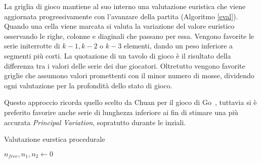 \documentclass{article}
\begin{document}
La griglia di gioco mantiene al suo interno una valutazione euristica che viene
aggiornata progressivamente con l'avanzare della partita (Algoritmo \vref{eval}). Quando una cella viene
marcata si valuta la variazione del valore euristico osservando le righe,
colonne e diaginali che passano per essa. Vengono favorite le serie initerrotte
di $k-1, k-2$ o $k-3$ elementi, dando un peso inferiore a segmenti pi\`u corti.
La quotazione di un tavolo di gioco \`e il risultato della differenza tra i
valori delle serie dei due giocatori. Oltretutto vengono favorite griglie che
assumono valori promettenti con il minor numero di mosse, dividendo ogni
valutazione per la profondit\`a dello stato di gioco.

Questo approccio ricorda quello scelto da Chuan per il gioco di Go~\cite{chuan},
tuttavia si \`e preferito favorire anche serie di lunghezza inferiore ai fin di
stimare una pi\`u accurata \emph{Principal Variation}, sopratutto durante le inziali.

\begin{algorithm}[H]
  \label{eval}
  \caption{Valutazione eurstica procedurale}


  $n_{free}, n_1, n_2 \gets 0$\;
  \;
   \; 
\end{algorithm}
\end{document}
